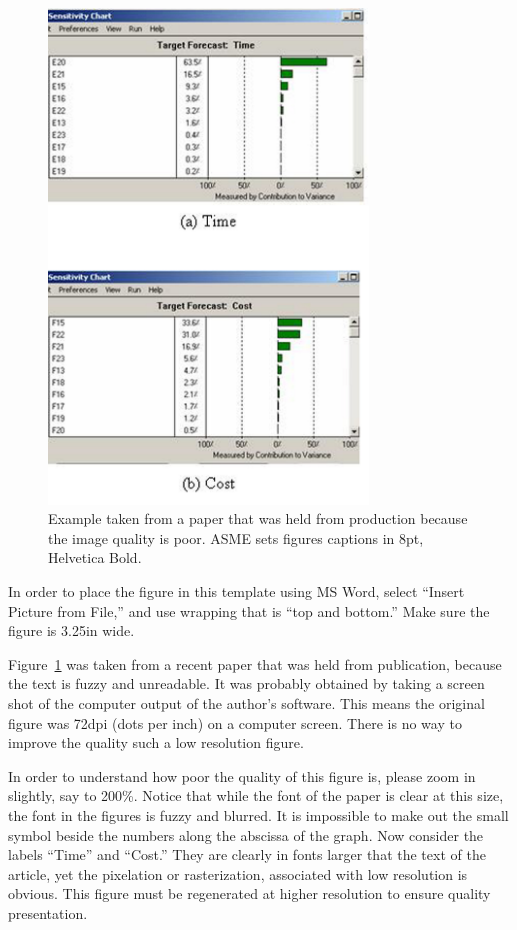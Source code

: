 \documentclass[twocolumn,10pt,journal]{asme2e}
\begin{document}
\begin{figure}
 \centerline{\includegraphics[width=3.34in]{figure/FMANU_MD_05_1107_11}}
 \caption{Example taken from a paper that was held from production because the image quality is poor.
  ASME sets figures captions in 8pt, Helvetica Bold.}
 \label{fig_example1.ps}
\end{figure}

In order to place the figure in this template using MS Word, select ``Insert Picture from File,'' and use wrapping that is ``top and bottom.'' Make sure the figure is 3.25in wide.

Figure~\ref{fig_example1.ps} was taken from a recent paper that was held from publication, because the text is fuzzy and unreadable.
It was probably obtained by taking a screen shot of the computer output of the author's software.
This means the original figure was 72dpi (dots per inch) on a computer screen.
There is no way to improve the quality such a low resolution figure.

In order to understand how poor the quality of this figure is, please zoom in slightly, say to 200\%.  Notice that while the font of the paper is clear at this size, the font in the figures is fuzzy and blurred.  It is impossible to make out the small symbol beside the numbers along the abscissa of the graph.  Now consider the labels ``Time'' and ``Cost.''  They are clearly in fonts larger that the text of the article, yet the pixelation or rasterization, associated with low resolution is obvious. This figure must be regenerated at higher resolution to ensure quality presentation.
\end{document}
